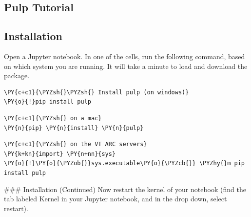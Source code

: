 

\hypertarget{pulp-tutorial}{%
\subsection{Pulp Tutorial}\label{pulp-tutorial}}

    \hypertarget{installation}{%
\subsection{Installation}\label{installation}}

Open a Jupyter notebook. In one of the cells, run the following command,
based on which system you are running. It will take a minute to load and
download the package.

    \begin{tcolorbox}[breakable, size=fbox, boxrule=1pt, pad at break*=1mm,colback=cellbackground, colframe=cellborder]
\begin{Verbatim}[commandchars=\\\{\}]
\PY{c+c1}{\PYZsh{}\PYZsh{} Install pulp (on windows)}
\PY{o}{!}pip install pulp
\end{Verbatim}
\end{tcolorbox}

    \begin{tcolorbox}[breakable, size=fbox, boxrule=1pt, pad at break*=1mm,colback=cellbackground, colframe=cellborder]
\begin{Verbatim}[commandchars=\\\{\}]
\PY{c+c1}{\PYZsh{} on a mac}
\PY{n}{pip} \PY{n}{install} \PY{n}{pulp}
\end{Verbatim}
\end{tcolorbox}

    \begin{tcolorbox}[breakable, size=fbox, boxrule=1pt, pad at break*=1mm,colback=cellbackground, colframe=cellborder]
\begin{Verbatim}[commandchars=\\\{\}]
\PY{c+c1}{\PYZsh{} on the VT ARC servers}
\PY{k+kn}{import} \PY{n+nn}{sys}
\PY{o}{!}\PY{o}{\PYZob{}}sys.executable\PY{o}{\PYZcb{}} \PYZhy{}m pip install pulp
\end{Verbatim}
\end{tcolorbox}

    \#\#\# Installation (Continued) Now restart the kernel of your notebook
(find the tab labeled Kernel in your Jupyter notebook, and in the drop
down, select restart).

